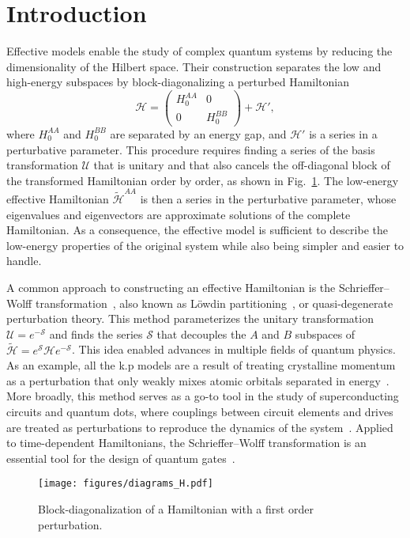 \section{Introduction}

Effective models enable the study of complex quantum systems by reducing the dimensionality of the Hilbert space.
Their construction separates the low and high-energy subspaces by block-diagonalizing a perturbed Hamiltonian
%
\begin{equation}
    \mathcal{H} = \begin{pmatrix}H_0^{AA} & 0 \\ 0 & H_0^{BB}\end{pmatrix} + \mathcal{H}',
\end{equation}
%
where $H_0^{AA}$ and $H_0^{BB}$ are separated by an energy gap, and $\mathcal{H}'$ is a series in a perturbative parameter.
This procedure requires finding a series of the basis transformation $\mathcal{U}$ that is unitary and that also cancels the off-diagonal block of the transformed Hamiltonian order by order, as shown in Fig.~\ref{fig:block_diagonalization}.
The low-energy effective Hamiltonian $\tilde{\mathcal{H}}^{AA}$ is then a series in the perturbative parameter, whose eigenvalues and eigenvectors are approximate solutions of the complete Hamiltonian.
As a consequence, the effective model is sufficient to describe the low-energy properties of the original system while also being simpler and easier to handle.

A common approach to constructing an effective Hamiltonian is the Schrieffer--Wolff transformation~\cite{Schrieffer_1966,Bravyi_2011}, also known as Löwdin partitioning~\cite{Lowdin_1962}, or quasi-degenerate perturbation theory.
This method parameterizes the unitary transformation $\mathcal{U} = e^{-\mathcal{S}}$ and finds the series $\mathcal{S}$ that decouples the $A$ and $B$ subspaces of $\tilde{\mathcal{H}} = e^{\mathcal{S}}\mathcal{H}e^{-\mathcal{S}}$.
This idea enabled advances in multiple fields of quantum physics.
As an example, all the k.p models are a result of treating crystalline momentum as a perturbation that only weakly mixes atomic orbitals separated in energy~\cite{Luttinger_1955,Winkler_2003,McCann_2013,Bernevig_2021}.
More broadly, this method serves as a go-to tool in the study of superconducting circuits and quantum dots, where couplings between circuit elements and drives are treated as perturbations to reproduce the dynamics of the system~\cite{Krantz_2019,Romhanyi_2015}.
Applied to time-dependent Hamiltonians, the Schrieffer--Wolff transformation is an essential tool for the design of quantum gates~\cite{Malekakhlagh_2020, Petrescu_2023}.
%
\begin{figure}[h!]
    \centering
    \texttt{[image: figures/diagrams\_H.pdf]}
    \caption{
      Block-diagonalization of a Hamiltonian with a first order perturbation.
    }
    \label{fig:block_diagonalization}
\end{figure}

